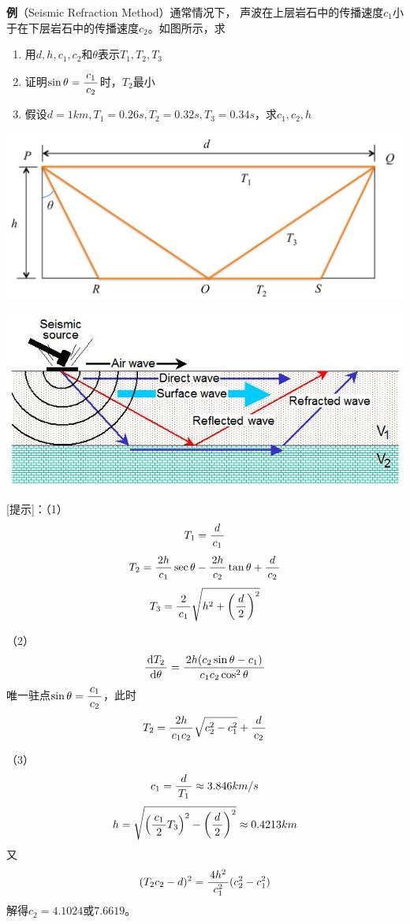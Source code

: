 {\bf 例}（Seismic Refraction Method）通常情况下，
声波在上层岩石中的传播速度$c_1$小于在下层岩石中的传播速度$c_2$。如图所示，求
\begin{enumerate}[(1)]
  \setlength{\itemindent}{1cm}
  \item 用$d,h,c_1,c_2$和$\theta$表示$T_1,T_2,T_3$
  \item 证明$\sin\theta=\displaystyle\frac{\,{c_1}\,}{\,{c_2}\,}$时，$T_2$最小
  \item 假设$d=1km,T_1=0.26s,T_2=0.32s,T_3=0.34s$，求$c_1,c_2,h$
\end{enumerate}
\begin{center}
	\includegraphics[width=.6\textwidth]{./images/ch03/eWave.pdf}
	
	\includegraphics[width=.6\textwidth]{./images/ch03/RS-structure.jpg}
\end{center}

[提示]：（1）
$$T_1=\displaystyle\frac{\,{d}\,}{\,{c_1}\,}$$
$$T_2=\displaystyle\frac{\,{2h}\,}{\,{c_1}\,}\sec\theta-\displaystyle\frac{\,{2h}\,}{\,{c_2}\,}\tan\theta+\displaystyle\frac{\,{d}\,}{\,{c_2}\,}$$
$$T_3=\displaystyle\frac{\,{2}\,}{\,{c_1}\,}\sqrt{h^2+\left(\displaystyle\frac{\,{d}\,}{\,{2}\,}\right)^2}$$


（2）
$$\displaystyle\frac{\,{\mathrm{d} T_2}\,}{\,{\mathrm{d}\theta}\,}=\displaystyle\frac{\,{2h(c_2\sin\theta-c_1)}\,}{\,{c_1c_2\cos^2\theta}\,}$$
唯一驻点$\sin\theta=\displaystyle\frac{\,{c_1}\,}{\,{c_2}\,}$，此时
$$T_2=\displaystyle\frac{\,{2h}\,}{\,{c_1c_2}\,}\sqrt{c_2^2-c_1^2}+\displaystyle\frac{\,{d}\,}{\,{c_2}\,}$$

（3）
$$c_1=\displaystyle\frac{\,{d}\,}{\,{T_1}\,}\approx3.846km/s$$
$$h=\sqrt{\left(\displaystyle\frac{\,{c_1}\,}{\,{2}\,}T_3\right)^2-\left(\displaystyle\frac{\,{d}\,}{\,{2}\,}\right)^2}\approx0.4213km$$
又
$$(T_2c_2-d)^2=\displaystyle\frac{\,{4h^2}\,}{\,{c_1^2}\,}(c_2^2-c_1^2)$$
解得$c_2=4.1024$或$7.6619$。

